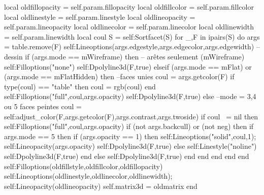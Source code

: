\documentclass[12pt]{standalone}
\begin{document}
\begin{luacode*}
    local oldfillopacity = self.param.fillopacity
    local oldfillcolor = self.param.fillcolor
    local oldlinestyle = self.param.linestyle
    local oldlineopacity = self.param.lineopacity
    local oldlinecolor = self.param.linecolor
    local oldlinewidth = self.param.linewidth  
    local coul
    S = self:Sortfacet(S)
    for _,F in ipairs(S) do
        args = table.remove(F)
        self:Lineoptions(args.edgestyle,args.edgecolor,args.edgewidth)
        -- dessin
        if (args.mode == mWireframe) then -- arêtes seulement (mWireframe)
            self:Filloptions("none")
            self:Dpolyline3d(F,true)
        elseif (args.mode == mFlat) or (args.mode == mFlatHidden) then --faces unies
            coul = args.getcolor(F)
            if type(coul) == "table" then coul = rgb(coul) end
            self:Filloptions("full",coul,args.opacity)
            self:Dpolyline3d(F,true)
        else --mode = 3,4 ou 5 faces peintes
            coul = self:adjust_color(F,args.getcolor(F),args.contrast,args.twoside)
            if coul ~= nil then
                self:Filloptions("full",coul,args.opacity)
                if (not args.backcull) or (not neg) then 
                    if args.mode == 5 then 
                        if (args.opacity == 1) then
                            self:Lineoptions("solid",coul,1); self:Lineopacity(args.opacity)
                            self:Dpolyline3d(F,true)
                        else
                            self:Linestyle("noline")
                            self:Dpolyline3d(F,true)
                        end   
                    else
                        self:Dpolyline3d(F,true)
                    end
                end
            end
        end
    end
    self:Filloptions(oldfillstyle,oldfillcolor,oldfillopacity)
    self:Lineoptions(oldlinestyle,oldlinecolor,oldlinewidth); self:Lineopacity(oldlineopacity)
    self.matrix3d = oldmatrix
end


\end{luacode*}
\end{document}
